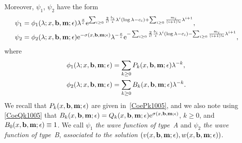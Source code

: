 \documentclass[11pt]{article}
\numberwithin{equation}{section}
\newcommand{\e}{\epsilon}
\numberwithin{equation}{section}
\begin{document}
Moreover, $\psi_1$, $\psi_2$ have the form
\begin{align}
&\psi_1 = \phi_1(\lambda; x, {\bf b}, {\bf m};\e) \lambda^{\frac{x}\e}
 {\rm e}^{\sum_{i\ge0} \frac{2}{i!} \frac{b_i}{\e} \lambda^i (\log \lambda-c_i)+\sum_{i\ge0} \frac{m_i}{(i+1)! \e} \lambda^{i+1}} , \label{psiphiform1} \\
&\psi_2 = \phi_2(\lambda; x, {\bf b}, {\bf m};\e) {\rm e}^{-\sigma(x,{\bf b},{\bf m};\e)} \lambda^{-\frac{x}\e}
 {\rm e}^{-\sum_{i\ge0} \frac{2}{i!} \frac{b_i}{\e} \lambda^i (\log \lambda-c_i)-\sum_{i\ge0} \frac{m_i}{(i+1)! \e} \lambda^{i+1}} , \label{psiphiform2}
\end{align}
where
\begin{align}
& \phi_1(\lambda; x, {\bf b}, {\bf m};\e) =\sum_{k\ge0} P_k(x, {\bf b}, {\bf m};\e) \lambda^{-k}, \label{phiexpansion1}\\
& \phi_2(\lambda; x, {\bf b}, {\bf m};\e) =\sum_{k\ge0} B_k(x, {\bf b}, {\bf m};\e) \lambda^{-k}. \label{phiexpansion2}
\end{align}
We recall that $P_k(x, {\bf b}, {\bf m};\e)$ are given in~\eqref{CoePk1005},
and we also note using \eqref{CoeQk1005} that $B_k(x, {\bf b}, {\bf m};\e)=Q_k(x, {\bf b},{\bf m};\e) {\rm e}^{\sigma(x, {\bf b},{\bf m};\e)}$, $k\geq 0$,
and $B_0(x, {\bf b}, {\bf m};\e)\equiv 1$.
We call $\psi_1$ {\it the wave function of type~A} and $\psi_2$ {\it the wave function of type~B},
{\it associated to the solution $(v(x, {\bf b}, {\bf m};\e), w(x, {\bf b}, {\bf m};\e))$}.
\end{document}
